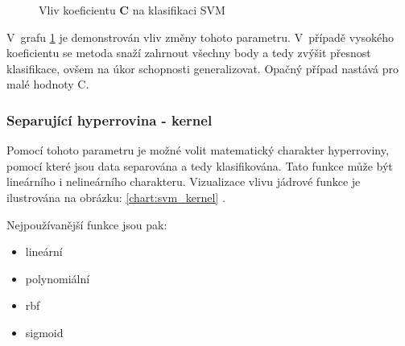 \begin{figure}[h!]
  \begin{center}
  \caption{Vliv koeficientu \textbf{C} na klasifikaci SVM}
  \end{center}\label{chart:svm_c}
\end{figure}

V~grafu \ref{chart:svm_c} je demonstrován vliv změny tohoto parametru. V~případě vysokého koeficientu se metoda snaží zahrnout všechny body a tedy zvýšit přesnost klasifikace, ovšem na úkor schopnosti generalizovat. Opačný případ nastává pro malé hodnoty C. 

\subsubsection{Separující hyperrovina - kernel}
Pomocí tohoto parametru je možné volit matematický charakter hyperroviny, pomocí které jsou data separována a tedy klasifikována. Tato funkce může být lineárního i nelineárního charakteru. Vizualizace vlivu jádrové funkce je ilustrována na obrázku: \ref{chart:svm_kernel} \cite{kernel_types}. 


Nejpoužívanější funkce jsou pak: 
\begin{itemize}
    \item lineární 
    \item polynomiální
    \item rbf
    \item sigmoid
\end{itemize}


